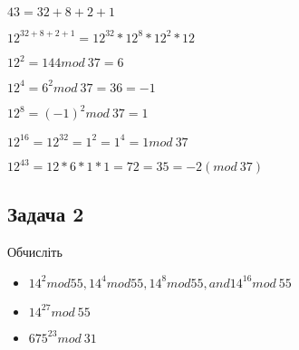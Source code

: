 \documentclass{article}
\begin{document}
$43 = 32 + 8 + 2 +1$

$12^{32 + 8 + 2 + 1} = 12^{32}*12^8*12^2*12$

$12^2 = 144 mod\ 37 = 6$

$12^4 = 6^2 mod\ 37 = 36 = -1$

$12^8 = (-1)^2 mod\ 37 = 1$

$12^{16}=12^{32}=1^2=1^4=1 mod\ 37$

$12^{43} = 12*6*1*1 = 72 = 35 = -2 (mod\ 37)$

\subsection*{Задача 2}
Обчисліть
\begin{itemize}
    \item $14^2 mod 55, 14^4 mod 55, 14^8 mod 55, and 14^16 mod\ 55$
    \item $14^{27} mod\ 55$
    \item $675^{23} mod\ 31$
\end{itemize}
\end{document}
